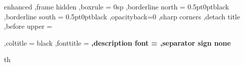 \usepackage{amsmath,amsfonts,amsthm,amssymb,mathtools}
\usepackage{fancyhdr}
\usepackage{enumitem}
\usepackage{bookmark}
\usepackage{xfrac}
\usepackage{graphicx}
\usepackage[english]{babel}
\usepackage{mathrsfs}
\usepackage{centernot}
\usepackage{geometry}
\usepackage{titlesec}
\usepackage{etoolbox}
\usepackage{tocloft}
\usepackage{xcolor}
\usepackage{varwidth}
\usepackage{varwidth}
\usepackage{etoolbox}
\usepackage{multicol,array}
\usepackage{xifthen}
\usepackage{pdfpages}
\usepackage{tcolorbox}
\usepackage{transparent}
\usepackage{ragged2e}
\usepackage{tikzsymbols}
\renewcommand\qedsymbol{$\blacksquare$}
\usepackage{blindtext}
\usepackage{lipsum}
\usepackage[utf8]{vietnam}
\usepackage[T1]{fontenc}
\usepackage{cases}









{%
	enhanced
	,frame hidden
	,boxrule = 0sp
	,borderline north = {0.5pt}{0pt}{black}
	,borderline south = {0.5pt}{0pt}{black}
  ,opacityback=0
	,sharp corners
	,detach title
	,before upper = \tcbtitle\par\smallskip
	,coltitle = black
	,fonttitle = \bfseries\sffamily
	,description font = \mdseries
	,separator sign none
}
{th}

